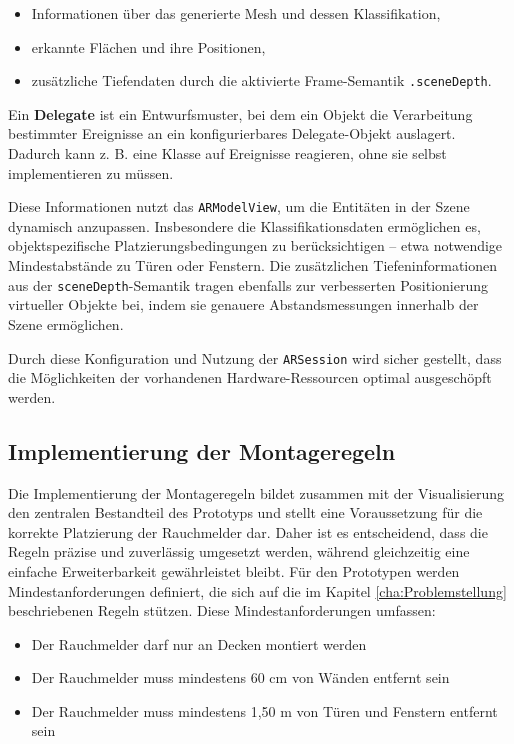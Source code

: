 \begin{itemize}
    \item Informationen über das generierte Mesh und dessen Klassifikation,
    \item erkannte Flächen und ihre Positionen,
    \item zusätzliche Tiefendaten durch die aktivierte Frame-Semantik \texttt{.sceneDepth}.
\end{itemize}

\begin{tcolorbox}[colback=THAi-Blue!20!white, colframe=THAi-Blue]
    Ein \textbf{Delegate} ist ein Entwurfsmuster, bei dem ein Objekt die Verarbeitung bestimmter Ereignisse an ein konfigurierbares Delegate-Objekt auslagert. Dadurch kann z. B. eine Klasse auf Ereignisse reagieren, ohne sie selbst implementieren zu müssen. \cite{appledevdoc}
\end{tcolorbox}  

Diese Informationen nutzt das \texttt{ARModelView}, um die Entitäten in der Szene dynamisch anzupassen. Insbesondere die Klassifikationsdaten ermöglichen es, objektspezifische Platzierungsbedingungen zu berücksichtigen – etwa notwendige Mindestabstände zu Türen oder Fenstern. Die zusätzlichen Tiefeninformationen aus der \texttt{sceneDepth}-Semantik tragen ebenfalls zur verbesserten Positionierung virtueller Objekte bei, indem sie genauere Abstandsmessungen innerhalb der Szene ermöglichen.

Durch diese Konfiguration und Nutzung der \texttt{ARSession} wird sicher gestellt, dass die Möglichkeiten der vorhandenen Hardware-Ressourcen optimal ausgeschöpft werden.

\subsection{Implementierung der Montageregeln}\label{sec:ImplMontageregeln}

Die Implementierung der Montageregeln bildet zusammen mit der Visualisierung den zentralen Bestandteil des Prototyps und stellt eine Voraussetzung für die korrekte Platzierung der Rauchmelder dar. Daher ist es entscheidend, dass die Regeln präzise und zuverlässig umgesetzt werden, während gleichzeitig eine einfache Erweiterbarkeit gewährleistet bleibt. Für den Prototypen werden Mindestanforderungen definiert, die sich auf die im Kapitel \ref{cha:Problemstellung} beschriebenen Regeln stützen. Diese Mindestanforderungen umfassen:

\begin{itemize}
    \item Der Rauchmelder darf nur an Decken montiert werden
    \item Der Rauchmelder muss mindestens 60 cm von Wänden entfernt sein
    \item Der Rauchmelder muss mindestens 1,50 m von Türen und Fenstern entfernt sein
\end{itemize}


